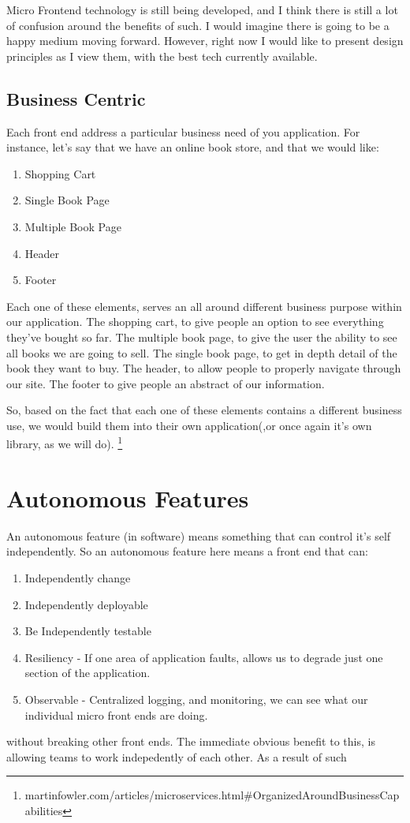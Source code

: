 Micro Frontend technology is still being developed, and I think there is still a lot of confusion around the benefits of such. I would imagine there is going to be a happy medium moving forward. However, right now I would like to present design principles as I view them, with the best tech currently available. 

\subsection{Business Centric}
Each front end address a particular business need of you application.
For instance, let's say that we have an online book store, and that we would like:
\begin{enumerate}
  \item Shopping Cart
  \item Single Book Page
  \item Multiple Book Page
  \item Header
  \item Footer 
\end{enumerate}

Each one of these elements, serves an all around different business purpose within our application. The shopping cart, to give people an option to see everything they've bought so far. The multiple book page, to give the user the ability to see all books we are going to sell. The single book page, to get in depth detail of the book they want to buy. The header, to allow people to properly navigate through our site. The footer to give people an abstract of our information. 

So, based on the fact that each one of these elements contains a different business use, we would build them into their own application(,or once again it's own library, as we will do). \footnote{martinfowler.com/articles/microservices.html\#OrganizedAroundBusinessCapabilities}

\section{Autonomous Features}
An autonomous feature (in software) means something that can control it's self independently. So an autonomous feature here means a front end that can:
\begin{enumerate}
  \item Independently change 
  \item Independently deployable
  \item Be Independently testable
  \item Resiliency - If one area of application faults, allows us to degrade just one section of the application. 
  \item Observable - Centralized logging, and monitoring, we can see what our individual micro front ends are doing.
\end{enumerate}
without breaking other front ends. The immediate obvious benefit to this, is allowing teams to work indepedently of each other. As a result of such


